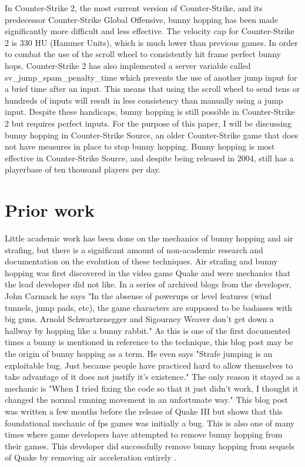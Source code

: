 \documentclass[10pt,twocolumn]{article}
\begin{document}
In Counter-Strike 2, the most current version of Counter-Strike, and its predecessor Counter-Strike Global Offensive, bunny hopping has been made significantly more difficult and less effective. The velocity cap for Counter-Strike 2 is 330 HU (Hammer Units), which is much lower than previous games. In order to combat the use of the scroll wheel to consistently hit frame perfect bunny hops, Counter-Strike 2 has also implemented a server variable called sv\_jump\_spam\_penalty\_time which prevents the use of another jump input for a brief time after an input\cite{HowToBhopCS2}. This means that using the scroll wheel to send tens or hundreds of inputs will result in less consistency than manually using a jump input. Despite these handicaps, bunny hopping is still possible in Counter-Strike 2 but requires perfect inputs. For the purpose of this paper, I will be discussing bunny hopping in Counter-Strike Source, an older Counter-Strike game that does not have measures in place to stop bunny hopping. Bunny hopping is most effective in Counter-Strike Source, and despite being released in 2004, still has a playerbase of ten thousand players per day\cite{SourceSteamCharts}.


\section{Prior work}

Little academic work has been done on the mechanics of bunny hopping and air strafing, but there is a significant amount of non-academic research and documentation on the evolution of these techniques. Air strafing and bunny hopping was first discovered in the video game Quake and were mechanics that the lead developer did not like. In a series of archived blogs from the developer, John Carmack he says "In the absense of powerups or level features (wind tunnels, jump pads, etc), the game characters are supposed to be badasses with big guns. Arnold Schwartzenegger and Sigourney Weaver don't get down a hallway by hopping like a bunny rabbit." \cite{CarmackPlan} As this is one of the first documented times a bunny is mentioned in reference to the technique, this blog post may be the origin of bunny hopping as a term.
He even says "Strafe jumping is an exploitable bug. Just because people have practiced hard to allow themselves to take advantage of it does not justify it's existence." The only reason it stayed as a mechanic is "When I tried fixing the code so that it just didn't work, I thought it changed the normal running movement in an unfortunate way."\cite{CarmackPlan} This blog post was written a few months before the release of Quake III but shows that this foundational mechanic of fps games was initially a bug. This is also one of many times where game developers have attempted to remove bunny hopping from their games. This developer did successfully remove bunny hopping from sequels of Quake by removing air acceleration entirely \cite{bhopHistory}.
    
\end{document}
